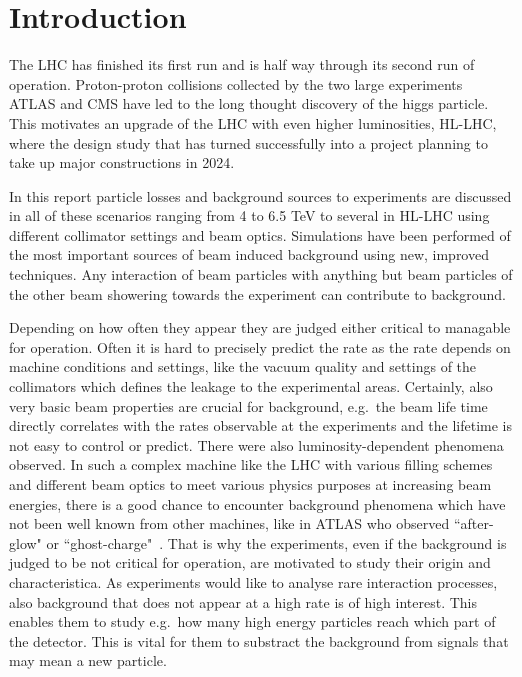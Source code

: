 \section{Introduction}


The LHC has finished its first run and is half way through its second run of operation. Proton-proton collisions collected by the two large experiments ATLAS and CMS have led to the long thought discovery of the higgs particle. This motivates an upgrade of the LHC with even higher luminosities, HL-LHC, where the design study that has turned successfully into a project planning to take up major constructions in 2024.

In this report particle losses and background sources to experiments are discussed in all of these scenarios ranging from 4 to 6.5 TeV to several in HL-LHC using different collimator settings and beam optics. Simulations have been performed of the most important sources of beam induced background using new, improved techniques. Any interaction of beam particles with anything but beam particles of the other beam showering towards the experiment can contribute to background.

Depending on how often they appear they are judged either critical to managable for operation. Often it is hard to precisely predict the rate as the rate depends on machine conditions and settings, like the vacuum quality and settings of the collimators which defines the leakage to the experimental areas. Certainly, also very basic beam properties are crucial for background, e.g.~the beam life time directly correlates with the rates observable at the experiments and the lifetime is not easy to control or predict. There were also luminosity-dependent phenomena observed. In such a complex machine like the LHC with various filling schemes and different beam optics to meet various physics purposes at increasing beam energies, there is a good chance to encounter background phenomena which have not been well known from other machines, like in ATLAS who observed ``after-glow" or ``ghost-charge"~\cite{ATLAS_JINST_13}. That is why the experiments, even if the background is judged to be not critical for operation, are motivated to study their origin and characteristica. As experiments would like to analyse rare interaction processes, also background that does not appear at a high rate is of high interest. This enables them to study e.g.~how many high energy particles reach which part of the detector. This is vital for them to substract the background from signals that may mean a new particle. 

